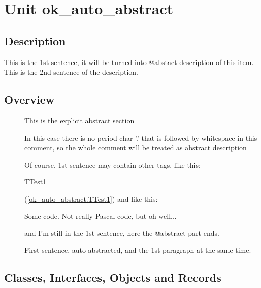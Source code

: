 \documentclass{report}
\newif\ifpdf
\begin{document}
\label{toc}\tableofcontents
\newpage
\newlength{\tmplength}
\chapter{Unit ok{\_}auto{\_}abstract}
\label{ok_auto_abstract}
\section{Description}
This is the 1st sentence, it will be turned into @abstact description of this item. This is the 2nd sentence of the description.
\section{Overview}
\begin{description}
\item[\texttt{\begin{ttfamily}TTest1\end{ttfamily} Class}]This is the explicit abstract section
\item[\texttt{\begin{ttfamily}TTest2\end{ttfamily} Class}]In this case there is no period char '.' that is followed by whitespace in this comment, so the whole comment will be treated as abstract description
\item[\texttt{\begin{ttfamily}TTest3\end{ttfamily} Class}]Of course, 1st sentence may contain other tags, like this: \begin{ttfamily}TTest1\end{ttfamily}(\ref{ok_auto_abstract.TTest1}) and like this: \begin{ttfamily}Some code. Not really Pascal code, but oh well...\end{ttfamily} and I'm still in the 1st sentence, here the @abstract part ends.
\item[\texttt{\begin{ttfamily}TTest4\end{ttfamily} Class}]First sentence, auto{-}abstracted, and the 1st paragraph at the same time.
\end{description}
\section{Classes, Interfaces, Objects and Records}
\ifpdf
\end{document}
